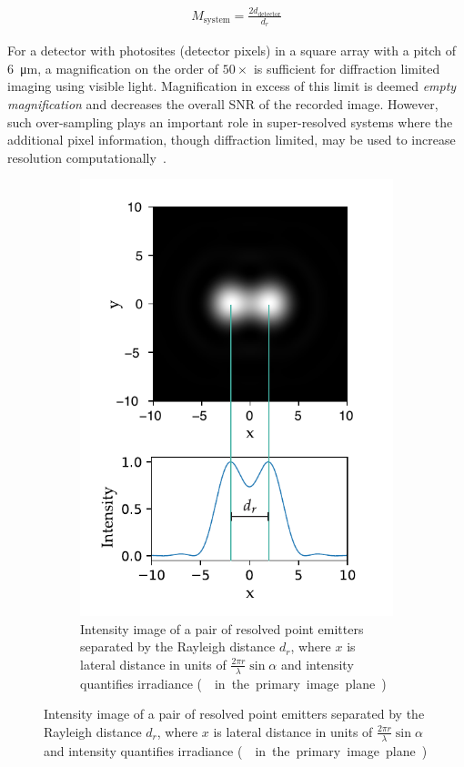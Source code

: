 \begin{align}
    M_\text{system} = \frac{2d_\text{detector}}{d_r}
\end{align}

For a detector with \gls{photosite}s (detector pixels) in a square array with a pitch of \SI{6}{\micro\meter}, a magnification on the order of \(50\times \) is sufficient for diffraction limited imaging using visible light.
Magnification in excess of this limit is deemed \emph{empty magnification} and decreases the overall \gls{SNR} of the recorded image.
However, such over-sampling plays an important role in super-resolved systems where the additional pixel information, though diffraction limited, may be used to increase resolution computationally~\cite{betzigImagingIntracellularFluorescent2006}.
\pagebreak
\begin{figure}
    \centering
    \begin{subfigure}[b]{\textwidth}
        \centering
        \includegraphics{./sampling/sample_master}
        \caption{Intensity image of a pair of resolved point emitters separated by the Rayleigh distance \(d_{r} \), where \(x \) is lateral distance in units of \(\frac{2\pi r }{\lambda}\sin {\alpha} \) and intensity quantifies irradiance (\SI{}{\watt\per\meter\square} in the primary image plane.)}\label{fig:sample_master}
    \end{subfigure}
\end{figure}
